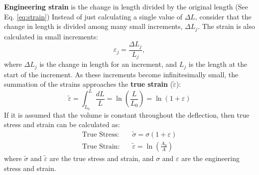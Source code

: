 \documentclass{article}
\begin{document}
    \textbf{Engineering strain} is the change in length divided by the original length (See Eq. \ref{eq:strain}) Instead of just calculating a single value of $\Delta L$, consider that the change in length is divided among many small increments, $\Delta L_j$. The strain is also calculated in small increments:
    \begin{equation}
        \varepsilon_j = \frac{\Delta L_j}{L_j},
    \end{equation}
    where $\Delta L_j$ is the change in length for an increment, and $L_j$ is the length at the start of the increment. As these increments become infinitesimally small, the summation of the strains approaches the \textbf{true strain} ($\tilde{\varepsilon}$):
    \begin{equation}
        \tilde{\varepsilon} = \int_{L_0}^{L} \frac{dL}{L}=\ln\left(\frac{L}{L_0}\right)=\ln(1+\varepsilon)
    \end{equation}
    If it is assumed that the volume is constant throughout the deflection, then true stress and strain can be calculated as:
    \begin{align}
        \text{True Stress:} & \quad \tilde{\sigma} = \sigma \left( 1 + \varepsilon \right) \\
        \text{True Strain:} & \quad \tilde{\varepsilon} = \ln \left(\frac{A_0}{A}\right)
    \end{align}
    where $\tilde{\sigma}$ and $\tilde{\varepsilon}$ are the true stress and strain, and $\sigma$ and $\varepsilon$ are the engineering stress and strain.
    \newpage
\end{document}
